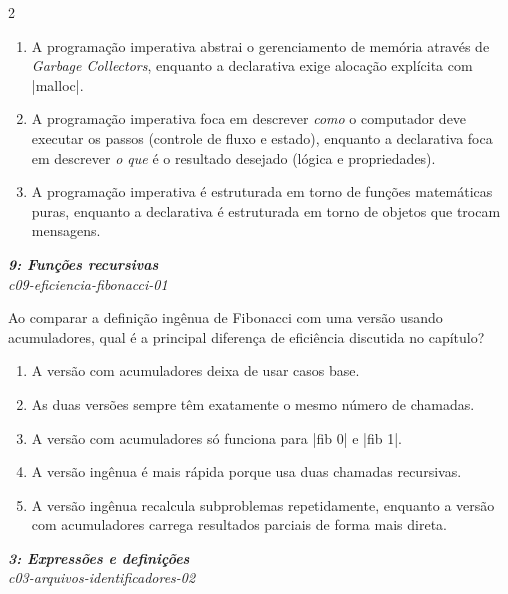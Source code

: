 \documentclass[a4paper,10pt,brazil]{article}
\begin{document}
\begin{multicols}{2}
\begin{enumerate}
  \item A programação imperativa abstrai o gerenciamento de memória através de \emph{Garbage Collectors}, enquanto a declarativa exige alocação explícita com \cinline|malloc|.

  \item A programação imperativa foca em descrever \emph{como} o computador deve executar os passos (controle de fluxo e estado), enquanto a declarativa foca em descrever \emph{o que} é o resultado desejado (lógica e propriedades).

  \item A programação imperativa é estruturada em torno de funções matemáticas puras, enquanto a declarativa é estruturada em torno de objetos que trocam mensagens.


\end{enumerate}

\begin{flushright}
  \footnotesize
  \textit{\textbf{9: Funções recursivas}}\\
  \textit{c09-eficiencia-fibonacci-01}\\

\end{flushright}
Ao comparar a definição ingênua de Fibonacci com uma versão usando acumuladores, qual é a principal diferença de eficiência discutida no capítulo?

\begin{enumerate}
  \item A versão com acumuladores deixa de usar casos base.

  \item As duas versões sempre têm exatamente o mesmo número de chamadas.

  \item A versão com acumuladores só funciona para \haskellinline|fib 0| e \haskellinline|fib 1|.

  \item A versão ingênua é mais rápida porque usa duas chamadas recursivas.

  \item A versão ingênua recalcula subproblemas repetidamente, enquanto a versão com acumuladores carrega resultados parciais de forma mais direta.


\end{enumerate}

\begin{flushright}
  \footnotesize
  \textit{\textbf{3: Expressões e definições}}\\
  \textit{c03-arquivos-identificadores-02}\\


\end{flushright}
\end{multicols}
\end{document}
